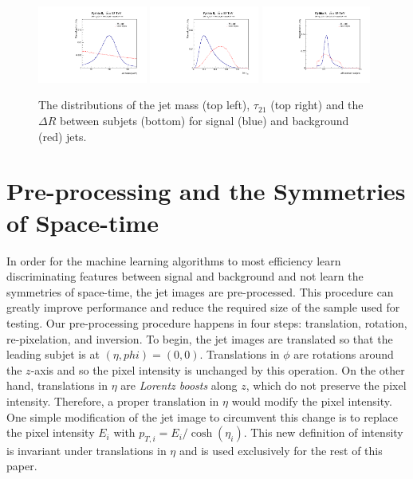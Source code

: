 \begin{figure}[bt]
  \begin{center}
        \includegraphics[width=0.32\textwidth]{figures/mass.pdf} 
        \includegraphics[width=0.32\textwidth]{figures/tau21.pdf} 
        \includegraphics[width=0.32\textwidth]{figures/dR.pdf}
      \caption{ The distributions of the jet mass (top left), $\tau_{21}$ (top right) and the $\Delta R$ between subjets (bottom) for signal (blue) and background (red) jets.
      \label{fig:datastats} }
    \end{center}
\end{figure}

\newpage
\clearpage

\section{Pre-processing and the Symmetries of Space-time}
\label{sec:preprocess}

In order for the machine learning algorithms to most efficiency learn discriminating features between signal and background and not learn the symmetries of space-time, the jet images are pre-processed.  This procedure can greatly improve performance and reduce the required size of the sample used for testing.  Our pre-processing procedure happens in four steps: translation, rotation, re-pixelation, and inversion.  To begin, the jet images are translated so that the leading subjet is at $(\eta,phi)=(0,0)$.  Translations in $\phi$ are rotations around the $z$-axis and so the pixel intensity is unchanged by this operation.  On the other hand, translations in $\eta$ are {\it Lorentz boosts} along $z$, which do not preserve the pixel intensity.  Therefore, a proper translation in $\eta$ would modify the pixel intensity.  One simple modification of the jet image to circumvent this change is to replace the pixel intensity $E_i$ with $p_{T,i}=E_i/\cosh(\eta_i)$.  This new definition of intensity is invariant under translations in $\eta$ and is used exclusively for the rest of this paper.

